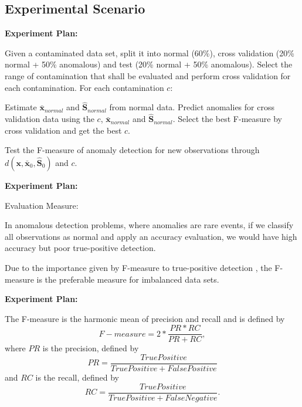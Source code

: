 \documentclass[review]{elsarticle}
\begin{document}
\subsection{Experimental Scenario}
\label{sec:AnalyzedScenario}

\textbf{Experiment Plan:}

	Given a contaminated data set, split it into normal (60\%), cross validation (20\% normal + 50\% anomalous) and test (20\% normal + 50\% anomalous).
	Select the range of contamination that shall be evaluated and perform cross validation for each contamination. 
	For each contamination $c$:
	
		Estimate $\boldsymbol{\bar{x}}_{normal}$ and $\boldsymbol{\hat{S}}_{normal}$ from normal data.
		Predict anomalies for cross validation data using the $c$, $\boldsymbol{\bar{x}}_{normal}$ and $\boldsymbol{\hat{S}}_{normal}$.
		Select the best F-measure by cross validation and get the best $c$.
	
	Test the F-measure of anomaly detection for new observations through $d(\boldsymbol{x},\bar{\boldsymbol{x}}_0, \boldsymbol{\hat{S}}_0)$ and $c$.


\textbf{Experiment Plan:}

Evaluation Measure:

In anomalous detection problems, where anomalies are rare events, if we classify all observations as normal and apply an accuracy evaluation, we would have high accuracy but poor true-positive detection.

Due to the importance given by F-measure to true-positive detection \cite{powers2011evaluation,moustafa2019holistic}, the F-measure is the preferable measure for imbalanced data sets.

\textbf{Experiment Plan:}

	The F-measure is the harmonic mean of precision and recall and is defined by 
	\begin{equation}\label{eq:eq10}
		F-measure = 2 * \frac{PR * RC}{PR + RC},				
	\end{equation}
	where $PR$ is the precision, defined by 
	\begin{equation}\label{eq:eq11}
		PR = \frac{True Positive}{True Positive + False Positive}
	\end{equation}
	and $RC$ is the recall, defined by 
	\begin{equation}\label{eq:eq12}
		RC = \frac{True Positive}{True Positive + False Negative}.
	\end{equation}
\end{document}
